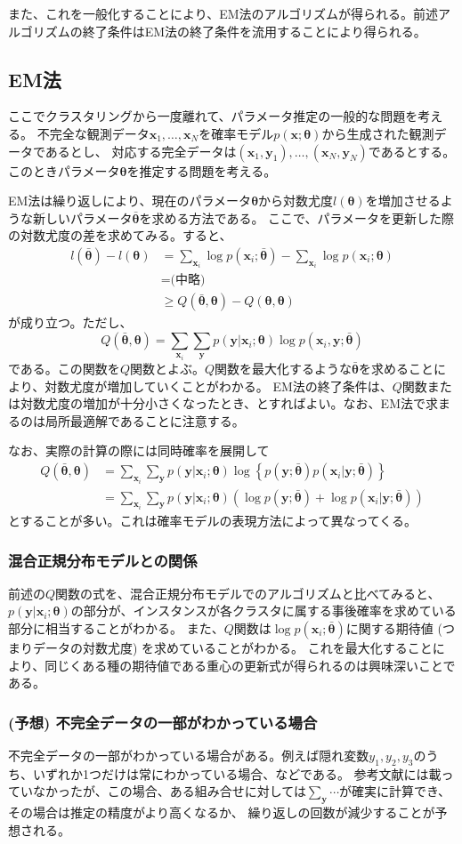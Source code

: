 \documentclass[9pt,draft,twocolumn]{jsarticle}
\newcommand{\bmx}{{\bm{x}}}
\newcommand{\bmy}{{\bm{y}}}
\newcommand{\bmt}{{\bm\theta}}
\newcommand{\bmtb}{\bar\bmt}
\newcommand{\dsum}{\displaystyle\sum}
\begin{document}
また、これを一般化することにより、EM法のアルゴリズムが得られる。前述アルゴリズムの終了条件はEM法の終了条件を流用することにより得られる。

\subsection{EM法}
ここでクラスタリングから一度離れて、パラメータ推定の一般的な問題を考える。
不完全な観測データ$\bm{x}_1,\ldots,\bm{x}_N$を確率モデル$p(\bm
x;\bm\theta)$から生成された観測データであるとし、 対応する完全データは$(\bm{x}_1,\bm{y}_1),\ldots,(\bm{x}_N,\bm{y}_N)$であるとする。
このときパラメータ$\bm{\theta}$を推定する問題を考える。

EM法は繰り返しにより、現在のパラメータ$\bm\theta$から対数尤度$l(\bm\theta)$を増加させるような新しいパラメータ$\bar{\bm\theta}$を求める方法である。
ここで、パラメータを更新した際の対数尤度の差を求めてみる。すると、
\[
\begin{split}
l(\bar{\bm\theta}) - l(\bm\theta) &= \sum_{\bm{x}_i} \log p(\bm x_i;\bmtb)
	- \sum_{\bm x_i} \log p(\bm x_i;\bmt) \\
	&= \text{(中略)} \\
	&\ge Q(\bmtb,\bmt) -Q(\bmt,\bmt)
\end{split}
\]
が成り立つ。ただし、
\[ Q(\bmtb,\bmt) = \sum_{\bm x_i} \sum_\bmy p(\bmy | \bmx_i ;\bmt) \log p(\bmx_i,\bmy;\bmtb) \]
である。この関数を$Q$関数とよぶ。$Q$関数を最大化するような$\bmtb$を求めることにより、対数尤度が増加していくことがわかる。
EM法の終了条件は、$Q$関数または対数尤度の増加が十分小さくなったとき、とすればよい。なお、EM法で求まるのは局所最適解であることに注意する。

なお、実際の計算の際には同時確率を展開して
\[
\begin{split}
Q(\bmtb,\bmt) &= \sum_{\bm x_i} \sum_\bmy p(\bmy | \bmx_i ;\bmt) 
	\log \left\{ p(\bmy;\bmtb) p(\bmx_i|\bmy;\bmtb) \right\} \\
&= \sum_{\bm x_i} \sum_\bmy p(\bmy | \bmx_i ;\bmt) 
	( \log p(\bmy;\bmtb) + \log p(\bmx_i|\bmy;\bmtb) )
\end{split} 
\]
とすることが多い。これは確率モデルの表現方法によって異なってくる。

\subsubsection{混合正規分布モデルとの関係}
前述の$Q$関数の式を、混合正規分布モデルでのアルゴリズムと比べてみると、$p(\bmy | \bmx_i
;\bmt)$の部分が、インスタンスが各クラスタに属する事後確率を求めている部分に相当することがわかる。
また、$Q$関数は$\log p(\bmx_i;\bmtb)$に関する期待値 (つまりデータの対数尤度) を求めていることがわかる。
これを最大化することにより、同じくある種の期待値である重心の更新式が得られるのは興味深いことである。

\subsubsection{(予想) 不完全データの一部がわかっている場合}
不完全データの一部がわかっている場合がある。例えば隠れ変数$y_1,y_2,y_3$のうち、いずれか1つだけは常にわかっている場合、などである。
参考文献には載っていなかったが、この場合、ある組み合せに対しては$\dsum_\bmy\cdots$が確実に計算でき、その場合は推定の精度がより高くなるか、
繰り返しの回数が減少することが予想される。



\end{document}
